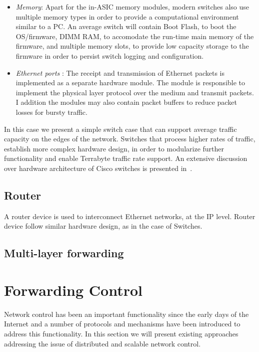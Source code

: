 \begin{itemize}
  \item \emph{Memory}: Apart for the in-ASIC memory modules, modern switches
        also use multiple memory types in order to provide a computational
        environment similar to a PC. An average switch will contain Boot Flash,
        to boot the OS/firmware, DIMM RAM, to accomodate the run-time main
        memory of the firmware, and multiple memory slots, to provide low
        capacity storage to the firmware in order to persist switch logging and
        configuration.
  \item \emph{Ethernet ports} : The receipt and transmission of Ethernet packets
        is implemented as a separate hardware module. The module is responsible
        to implement the physical layer protocol over the medium and transmit
        packets. I addition the modules may also contain packet buffers to
        reduce packet losses for bursty traffic.  \end{itemize}

In this case we present a simple switch case that can support average traffic
capacity on the edges of the network. Switches that process higher rates of
traffic, establish more complex hardware design, in order to modularize further
functionality and enable Terrabyte traffic rate support. An extensive discussion
over hardware architecture of Cisco switches is presented
in~\cite{cisco-routers}.

\subsection{Router}

A router device is used to interconnect Ethernet networks, at the IP level.
Router device follow similar hardware design, as in the case of Switches. 

\subsection{Multi-layer forwarding}

\section{Forwarding Control} \label{sec:backoground:netcontrol}

Network control has been an important functionality since the early days of the
Internet and a number of protocols and mechanisms have been introduced to
address this functionality. In this section we will present existing approaches
addressing the issue of distributed and scalable network control.

